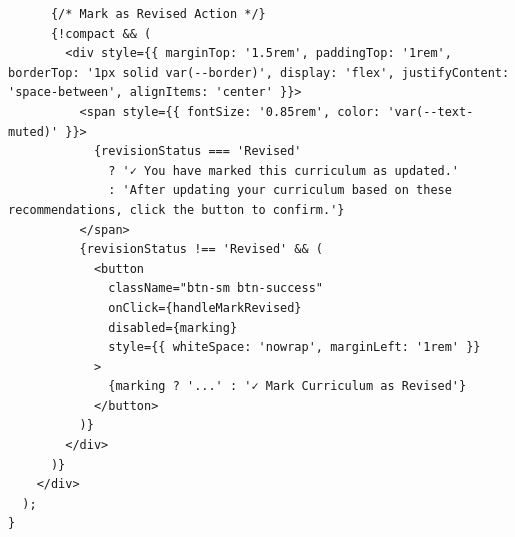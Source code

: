 \documentclass[12pt,a4paper]{report}
\begin{document}
\begin{verbatim}
      {/* Mark as Revised Action */}
      {!compact && (
        <div style={{ marginTop: '1.5rem', paddingTop: '1rem', borderTop: '1px solid var(--border)', display: 'flex', justifyContent: 'space-between', alignItems: 'center' }}>
          <span style={{ fontSize: '0.85rem', color: 'var(--text-muted)' }}>
            {revisionStatus === 'Revised'
              ? '✓ You have marked this curriculum as updated.'
              : 'After updating your curriculum based on these recommendations, click the button to confirm.'}
          </span>
          {revisionStatus !== 'Revised' && (
            <button
              className="btn-sm btn-success"
              onClick={handleMarkRevised}
              disabled={marking}
              style={{ whiteSpace: 'nowrap', marginLeft: '1rem' }}
            >
              {marking ? '...' : '✓ Mark Curriculum as Revised'}
            </button>
          )}
        </div>
      )}
    </div>
  );
}


\end{verbatim}
\end{document}
